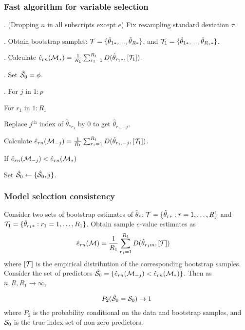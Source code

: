 \documentclass[10pt]{beamer}
\theoremstyle{definition}
\begin{document}
\begin{frame}
\frametitle{Fast algorithm for variable selection}

. (Dropping $n$ in all subscripts except $e$) Fix resampling standard deviation $\tau$.
\vspace{1em}

. Obtain bootstrap samples: ${\cal{T}} = \{ \hat\theta_{1 *}, ..., \hat\theta_{R *} \} $, and ${\cal{T}}_1 = \{ \hat\theta_{1 *}, ..., \hat\theta_{R_1 *} \} $.
\vspace{1em}

. Calculate $\hat e_{r n} ({\cal{M}}_*) = \frac{1}{R_1} \sum_{r_1=1}^{R_1} D ( \hat\theta_{r_1 *}, [{\cal{T}}_1] )$.
\vspace{1em}

. Set $\hat {{\cal{S}}}_0 = \phi$.
\vspace{1em}

. For $j$ in $1:p$

\hspace{1em} For $r_1$ in $1:R_1$

\hspace{2em} Replace $j^\text{th}$ index of $\hat\theta_{* r_1}$ by 0 to get $\hat \theta_{r_1, -j}$.

\hspace{1em} Calculate $\hat e_{r n} ({\cal{M}}_{-j}) = \frac{1}{R_1} \sum_{r_1=1}^{R_1} D ( \hat\theta_{r_1, -j}, [{\cal{T}}_1] )$.

\hspace{1em} If $\hat e_{r n} ({\cal{M}}_{-j}) < \hat e_{r n} ({\cal{M}}_*)$

\hspace{2em} Set $ \hat {{\cal{S}}}_0 \leftarrow \{ \hat {{\cal{S}}}_0, j \} $.
\end{frame}

\begin{frame}
\frametitle{Model selection consistency}
\begin{Corollary}\label{corollary:BootConsistency}
Consider two sets of bootstrap estimates of $\hat \theta_*$: ${\cal{T}} = \{ \hat \theta_{r *}: r = 1, \ldots, R \}$ and ${\cal{T}}_1 = \{ \hat \theta_{r_1 *}: r_1 = 1, \ldots, R_1 \}$. Obtain sample $e$-value estimates as
%
\begin{align*}
\hat e_{r n} ({\cal{M}}) & = \frac{1}{R_1} \sum_{r_1=1}^{R_1} D( \hat \theta_{r_1 m}, [ {\cal{T}} ])
\end{align*}
%
where $[{\cal{T}}]$ is the empirical distribution of the corresponding bootstrap samples. Consider the set of predictors $\hat {{\cal{S}}}_0 = \{ \hat e_{r n} ({\cal{M}}_{-j} ) < \hat e_{r n} ({\cal{M}}_*) \}$. Then as $n, R, R_1 \rightarrow \infty$,

%
\begin{align*}
P_2( \hat {{\cal{S}}}_0 = {\cal{S}}_0 ) \rightarrow 1
\end{align*}
%
where $P_2$ is the probability conditional on the data and bootstrap samples, and ${\cal{S}}_0$ is the true index set of non-zero predictors.
\end{Corollary}

\end{frame}
\end{document}

